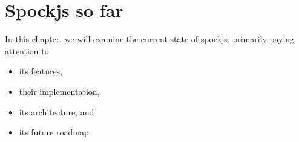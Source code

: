 \chapter{Spockjs so far}
In this chapter, we will examine the current state of spockjs,
primarily paying attention to
\begin{itemize}
  \item its features,
  \item their implementation,
  \item its architecture, and
  \item its future roadmap.
\end{itemize}




